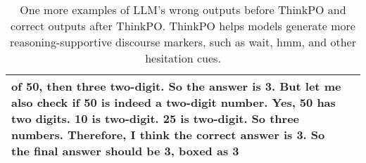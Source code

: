 \begin{table*}[ht]
{\begin{tabular}{p{0.5in}|p{6.4in}}
of 50, then three two-digit. So the answer is 3. But let me also check if 50 is indeed a two-digit number. Yes, 50 has two digits. 10 is two-digit. 25 is two-digit. So three numbers. Therefore, I think the correct answer is 3. So the final answer should be 3, boxed as 3\\
        \bottomrule
    \end{tabular}
    }
     \caption{One more examples of LLM's wrong outputs before ThinkPO and correct outputs after ThinkPO. ThinkPO helps models generate more reasoning-supportive discourse markers, such as wait, hmm, and other hesitation cues. }
    \label{fig:example2}
\end{table*}

